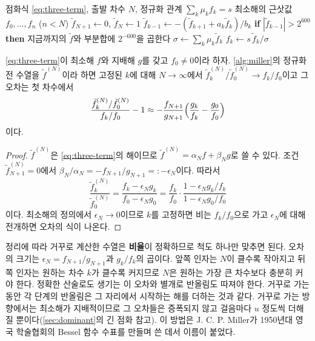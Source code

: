 \begin{algorithm}[htbp]
\begin{algorithmic}[1]
\Require 점화식 \cref{eq:three-term}, 출발 차수 $N$, 정규화 관계 $\sum_k\mu_kf_k=s$
\Ensure 최소해의 근삿값 $f_0,\dots,f_n$ ($n<N$)
\State $\tilde f_{N+1}\gets0$, $\tilde f_N\gets1$
  \State $\tilde f_{k-1}\gets-(\tilde f_{k+1}+a_k\tilde f_k)/b_k$ 
  \State \textbf{if} $|\tilde f_{k-1}|>2^{600}$ \textbf{then} 지금까지의 $\tilde f$와 부분합에 $2^{-600}$을 곱한다
\EndFor
\State $\sigma\gets\sum_k\mu_k\tilde f_k$ 
 $f_k\gets s\,\tilde f_k/\sigma$
\EndFor
\end{algorithmic}
\caption{Miller의 역방향 점화}
\label{alg:miller}
\end{algorithm}

\begin{theorem}
\label{thm:miller}
\cref{eq:three-term}이 최소해 $f$와 지배해 $g$를 갖고 $f_0\ne0$이라 하자. \cref{alg:miller}의 정규화 전 수열을 $\tilde f^{(N)}$이라 하면 고정된 $k$에 대해 $N\to\infty$에서 $\tilde f^{(N)}_k/\tilde f^{(N)}_0\to f_k/f_0$이고 그 오차는 첫 차수에서
\[
\frac{\tilde f^{(N)}_k/\tilde f^{(N)}_0}{f_k/f_0}-1\approx-\frac{f_{N+1}}{g_{N+1}}\Bigl(\frac{g_k}{f_k}-\frac{g_0}{f_0}\Bigr)
\]
이다.
\end{theorem}

\begin{proof}
$\tilde f^{(N)}$은 \cref{eq:three-term}의 해이므로 $\tilde f^{(N)}=\alpha_Nf+\beta_Ng$로 쓸 수 있다. 조건 $\tilde f^{(N)}_{N+1}=0$에서 $\beta_N/\alpha_N=-f_{N+1}/g_{N+1}=:-\epsilon_N$이다. 따라서
\[
\frac{\tilde f^{(N)}_k}{\tilde f^{(N)}_0}=\frac{f_k-\epsilon_Ng_k}{f_0-\epsilon_Ng_0}=\frac{f_k}{f_0}\cdot\frac{1-\epsilon_Ng_k/f_k}{1-\epsilon_Ng_0/f_0}
\]
이다. 최소해의 정의에서 $\epsilon_N\to0$이므로 $k$를 고정하면 비는 $f_k/f_0$으로 가고 $\epsilon_N$에 대해 전개하면 오차의 식이 나온다.
\end{proof}

정리에 따라 거꾸로 계산한 수열은 \textbf{비율}이 정확하므로 척도 하나만 맞추면 된다. 오차의 크기는 $\epsilon_N=f_{N+1}/g_{N+1}$과 $g_k/f_k$의 곱이다. 앞쪽 인자는 $N$이 클수록 작아지고 뒤쪽 인자는 원하는 차수 $k$가 클수록 커지므로 $N$은 원하는 가장 큰 차수보다 충분히 커야 한다. 정확한 산술로도 생기는 이 오차와 별개로 반올림도 따져야 한다. 거꾸로 가는 동안 각 단계의 반올림은 그 자리에서 시작하는 해를 더하는 것과 같다. 거꾸로 가는 방향에서는 최소해가 지배적이므로 그 오차들은 증폭되지 않고 걸음마다 $u$ 정도씩 더해질 뿐이다(\cref{sec:dominant}의 긴 점화 참고). 이 방법은 J. C. P. Miller가 1950년대 영국 학술협회의 Bessel 함수 수표를 만들며 쓴 데서 이름이 붙었다\cite{gautschi1967recurrence}.

